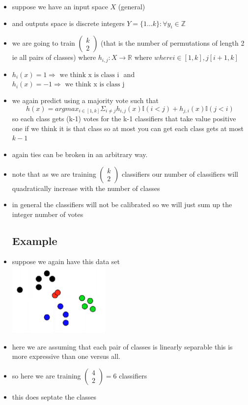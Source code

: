\documentclass{article}
\begin{document}
\begin{itemize}
\item suppose we have an input space $X$ (general)
\item and outputs space is discrete integers $Y=\{1...k\}:\forall y_i\in \mathbb{Z}$
\item we are going to train $\begin{pmatrix}k\\2
\end{pmatrix}$ (that is the number of permutations of length 2 ie all pairs of classes) where $h_{i,j}:X\rightarrow \mathbb{R} $  where $where i\in [1,k], j[i+1,k]$
\item  $h_i(x)=1\Rightarrow \text{ we think x is class i } $ and $h_i(x)=-1\Rightarrow \text{ we think x is class j } $  
\item we again predict using a majority vote such that 
$$h(x)=argmax_{i\in [1,k]}\Sigma_{i\neq j}h_{i,j}(x)\mathbb{I}(i<j)+h_{j,i}(x)\mathbb{I}(j<i)
$$ 
so each class gets (k-1) votes for the k-1 classifiers that take value positive one if we think it is that class so at most you can get each class gets at most $k-1$ 
\item again ties can be broken in an arbitrary way. 
\item note that as we are training $\begin{pmatrix}k\\2
\end{pmatrix}$ classifiers our number of classifiers will quadratically increase with the number of classes 
\item in general the classifiers will not be calibrated so we will just sum up the integer number of votes
\subsection*{Example}
\item suppose we again have this data set 
 \\ \includegraphics[width=5cm]{lecture_notes/lecture_8/immages/l8_3.png}
\item here we are assuming that each pair of classes is linearly separable this is more expressive than one versus all.
\item   so here we are training $\begin{pmatrix}4\\2
\end{pmatrix}=6$ classifiers 
\item this does septate the classes 

\end{itemize}
\end{document}
